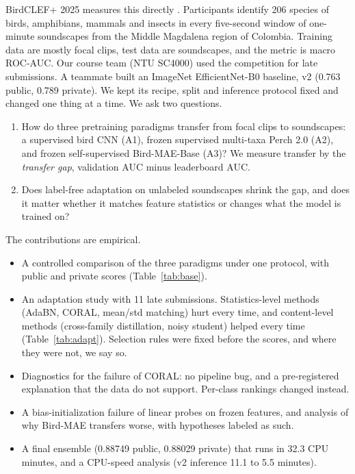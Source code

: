 \documentclass[letterpaper]{article} %
\begin{document}
BirdCLEF+ 2025 measures this directly \citep{canas2025birdclef}. Participants identify 206 species of birds, amphibians, mammals and insects in every five-second window of one-minute soundscapes from the Middle Magdalena region of Colombia. Training data are mostly focal clips, test data are soundscapes, and the metric is macro ROC-AUC. Our course team (NTU SC4000) used the competition for late submissions. A teammate built an ImageNet EfficientNet-B0 baseline, v2 (0.763 public, 0.789 private). We kept its recipe, split and inference protocol fixed and changed one thing at a time. We ask two questions.
\begin{enumerate}
\item How do three pretraining paradigms transfer from focal clips to soundscapes: a supervised bird CNN (A1), frozen supervised multi-taxa Perch 2.0 (A2), and frozen self-supervised Bird-MAE-Base (A3)? We measure transfer by the \emph{transfer gap}, validation AUC minus leaderboard AUC.
\item Does label-free adaptation on unlabeled soundscapes shrink the gap, and does it matter whether it matches feature statistics or changes what the model is trained on?
\end{enumerate}

\noindent The contributions are empirical.
\begin{itemize}
\item A controlled comparison of the three paradigms under one protocol, with public and private scores (Table~\ref{tab:base}).
\item An adaptation study with 11 late submissions. Statistics-level methods (AdaBN, CORAL, mean/std matching) hurt every time, and content-level methods (cross-family distillation, noisy student) helped every time (Table~\ref{tab:adapt}). Selection rules were fixed before the scores, and where they were not, we say so.
\item Diagnostics for the failure of CORAL: no pipeline bug, and a pre-registered explanation that the data do not support. Per-class rankings changed instead.
\item A bias-initialization failure of linear probes on frozen features, and analysis of why Bird-MAE transfers worse, with hypotheses labeled as such.
\item A final ensemble (0.88749 public, 0.88029 private) that runs in 32.3 CPU minutes, and a CPU-speed analysis (v2 inference 11.1 to 5.5 minutes).
\end{itemize}
\end{document}

